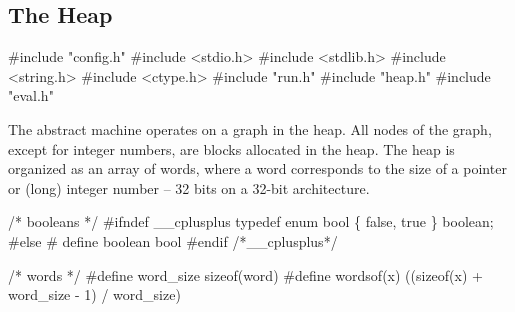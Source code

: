 %
%
\subsection{The Heap}
\nwenddocs{}\endmoddef\nwstartdeflinemarkup{}\nwenddeflinemarkup
#include "config.h"
#include <stdio.h>
#include <stdlib.h>
#include <string.h>
#include <ctype.h>
#include "run.h"
#include "heap.h"
#include "eval.h"

\nwendcode{}\nwdocspar
The abstract machine operates on a graph in the heap. All nodes of the
graph, except for integer numbers, are blocks allocated in
the heap. The heap is organized as an array of words, where a word
corresponds to the size of a pointer or (long) integer number --
32 bits on a 32-bit architecture.

\nwenddocs{}\endmoddef\nwstartdeflinemarkup{}\nwenddeflinemarkup
/* booleans */
#ifndef __cplusplus
typedef enum bool \{ false, true \} boolean;
#else
# define boolean bool
#endif /*__cplusplus*/

/* words */
#define word_size       sizeof(word)
#define wordsof(x)      ((sizeof(x) + word_size - 1) / word_size)

